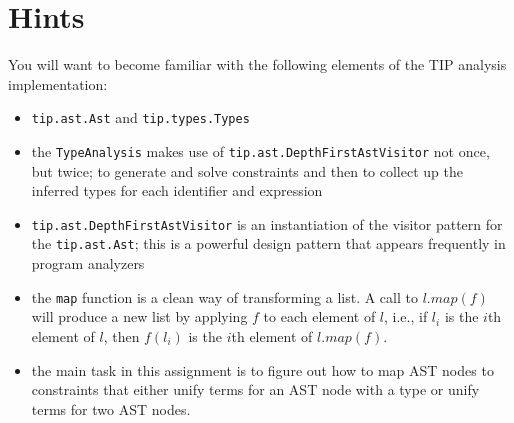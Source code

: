 \documentclass[12pt,letterpaper]{article}
\begin{document}
\section*{Hints}
You will want to become familiar with the following elements of the TIP analysis implementation:
\begin{itemize}
\item \texttt{tip.ast.Ast} and \texttt{tip.types.Types}
\item the \texttt{TypeAnalysis} makes use of \texttt{tip.ast.DepthFirstAstVisitor} not once, but twice; to generate and solve constraints and then to collect up the inferred types for each identifier and expression
\item \texttt{tip.ast.DepthFirstAstVisitor} is an instantiation of the visitor pattern for the \texttt{tip.ast.Ast}; this is a powerful design pattern that appears frequently in program analyzers
\item the \texttt{map} function is a clean way of transforming a list.  A call to $l.map(f)$ will produce a new list by applying $f$ to each element of $l$, i.e., if $l_i$ is the $i$th element of $l$, then $f(l_i)$ is the $i$th element of $l.map(f)$.
\item the main task in this assignment is to figure out how to map AST nodes to constraints that either unify terms for an AST node with a type or unify terms for two AST nodes.
\end{itemize}
\end{document}

